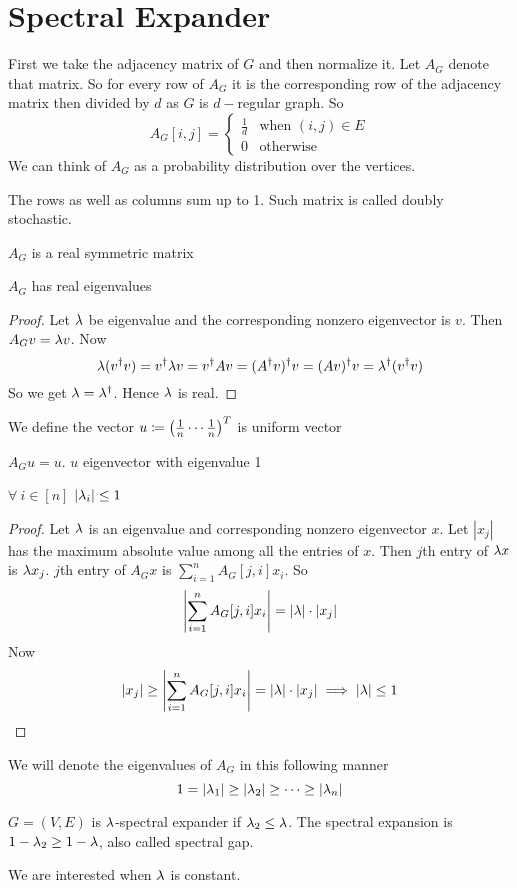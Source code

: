 \section{Spectral Expander}
First we take the adjacency matrix of $G$ and then normalize it. Let $A_G$ denote that matrix. So for every row of $A_G$ it is the corresponding row of the adjacency matrix then divided by $d$ as $G$ is $d-$regular graph. So $$A_G[i,j]=\begin{cases}
	\frac1d & \text{when $(i,j)\in E$}\\ 0 &\text{otherwise}
\end{cases}$$
We can think of $A_G$ as a probability distribution over the vertices.
\begin{observation}
	The rows as well as columns sum up to 1. Such matrix is called doubly stochastic.
\end{observation}
\begin{observation}
	$A_G$ is a real symmetric matrix
\end{observation}
\begin{lemma}
	$A_G$ has real eigenvalues
\end{lemma}
\begin{proof}
	Let $\lambda$ be eigenvalue and the corresponding nonzero eigenvector is $v$. Then $A_Gv=\lambda v$. Now $$\lambda (v^{\dagger}v)=v^{\dagger}\lambda v=v^{\dagger}Av=(A^{\dagger}v)^{\dagger}v=(Av)^{\dagger}v=\lambda^{\dagger}(v^{\dagger}v)$$So we get $\lambda=\lambda^{\dagger}$. Hence $\lambda $ is real.
\end{proof}
We define the vector $u\coloneqq  \left(\frac1n\cdots \frac1n\right)^T$ is uniform vector
\begin{observation}
	$A_Gu=u$. $u$ eigenvector with eigenvalue 1
\end{observation}
\begin{lemma}
	$\forall\ i\in [n]$ $|\lambda_i|\leq 1$
\end{lemma}
\begin{proof}
	Let $\lambda$ is an eigenvalue and corresponding nonzero eigenvector $x$. Let $|x_j|$ has the maximum absolute value among all the entries of $x$. Then $j$th entry of $\lambda x$ is $\lambda x_j$. $j$th entry of $A_Gx$ is $\sum\limits_{i=1}^nA_G[j,i]x_i$. So $$\left|\sum\limits_{i=1}^nA_G[j,i]x_i\right|=|\lambda|\cdot |x_j|$$Now $$|x_j|\geq \left|\sum\limits_{i=1}^nA_G[j,i]x_i\right|=|\lambda|\cdot |x_j|\implies |\lambda|\leq 	1$$
\end{proof}
\begin{remark}
	We will denote the eigenvalues of $A_G$ in this following manner $$1=|\lambda_1|\geq |\lambda _2|\geq \cdots \geq |\lambda_n|$$
\end{remark}
\begin{definition}
	$G=(V,E)$ is $\lambda$-spectral expander if $\lambda_2\leq \lambda$. The spectral expansion is $1-\lambda_2\geq 1-\lambda$, also called spectral gap.
\end{definition}
\begin{remark}
	We are interested when $\lambda$ is constant.
\end{remark}